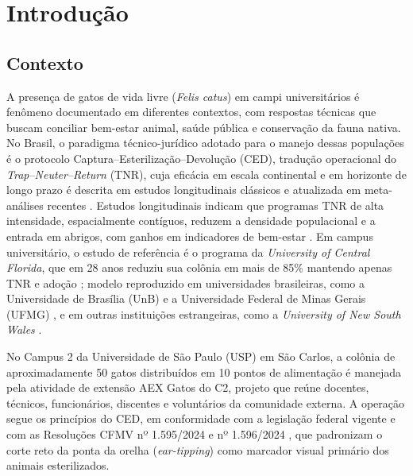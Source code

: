 \chapter{Introdução}
\label{cap:introducao}


\section{Contexto}
\label{sec:contexto}


A presença de gatos de vida livre (\textit{Felis catus}) em campi universitários é fenômeno documentado em diferentes contextos, com respostas técnicas que buscam conciliar bem-estar animal, saúde pública e conservação da fauna nativa. No Brasil, o paradigma técnico-jurídico adotado para o manejo dessas populações é o protocolo Captura--Esterilização--Devolução (CED), tradução operacional do \textit{Trap--Neuter--Return} (TNR), cuja eficácia em escala continental e em horizonte de longo prazo é descrita em estudos longitudinais clássicos \cite{levy2003longterm,natoli2019italy,kreisler2019orcat} e atualizada em meta-análises recentes \cite{cecchetti2025planning,schiefer2025tnr}. Estudos longitudinais indicam que programas TNR de alta intensidade, espacialmente contíguos, reduzem a densidade populacional e a entrada em abrigos, com ganhos em indicadores de bem-estar \cite{gunther2022reduction,spehar2019backtoschool}. Em campus universitário, o estudo de referência é o programa da \textit{University of Central Florida}, que em 28 anos reduziu sua colônia em mais de 85\% mantendo apenas TNR e adoção \cite{spehar2019backtoschool}; modelo reproduzido em universidades brasileiras, como a Universidade de Brasília (UnB) \cite{junqueira2024evaluation} e a Universidade Federal de Minas Gerais (UFMG) \cite{vecchi2022ethical}, e em outras instituições estrangeiras, como a \textit{University of New South Wales} \cite{passos2025population}.


No Campus 2 da Universidade de São Paulo (USP) em São Carlos, a colônia de aproximadamente 50 gatos distribuídos em 10 pontos de alimentação é manejada pela atividade de extensão AEX Gatos do C2, projeto que reúne docentes, técnicos, funcionários, discentes e voluntários da comunidade externa. A operação segue os princípios do CED, em conformidade com a legislação federal vigente \cite{brasil_lei13426_2017,brasil_lei15046_2024,brasil_decreto12439_2025} e com as Resoluções CFMV nº 1.595/2024 e nº 1.596/2024 \cite{cfmv_resolucao1595_2024,cfmv_resolucao1596_2024}, que padronizam o corte reto da ponta da orelha (\textit{ear-tipping}) como marcador visual primário dos animais esterilizados.


